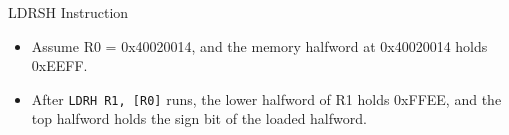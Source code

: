 \documentclass[9pt,aspectratio=169,xcolor=table]{beamer}
\begin{document}
{\begin{frame}[fragile]{LDRSH Instruction}
{%
	}
	\vspace{4mm}

	\begin{itemize}
		\item Assume R0 = 0x40020014, and the \alert{memory halfword} at 0x40020014 holds 0xEEFF.
		\item After \texttt{LDRH R1, [R0]} runs, the lower halfword of R1 holds 0xFFEE, and the top halfword holds the sign bit of the loaded halfword.
	\end{itemize}
\end{frame}
}

\end{document}
